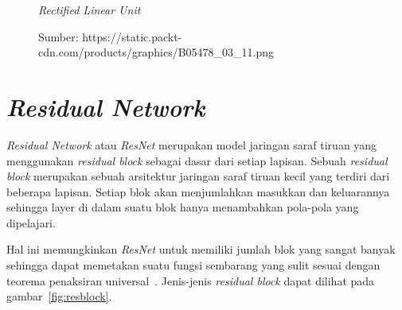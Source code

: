 \begin{figure}[htbp]
    \begin{center}
    \end{center}
    \vspace{-20pt}
    \captionsetup{labelfont=bf, textfont=bf}
    \caption{\textit{Rectified Linear Unit}}
    \vspace{-10pt}
    \captionsetup{labelfont=md, textfont=md}
    \caption*{Sumber: https://static.packt-cdn.com/products/graphics/B05478\_03\_11.png}
    \label{fig:relu}
\end{figure}

\section{\textit{Residual Network}}
\label{sec:2-ResidualNetwork}

\textit{Residual Network} atau \textit{ResNet} merupakan model jaringan saraf tiruan yang menggunakan \textit{residual block}
sebagai dasar dari setiap lapisan. Sebuah \textit{residual block} merupakan sebuah arsitektur jaringan
saraf tiruan kecil yang terdiri dari beberapa lapisan. Setiap blok akan menjumlahkan masukkan dan
keluarannya sehingga layer di dalam suatu blok hanya menambahkan pola-pola yang dipelajari.

Hal ini
memungkinkan \textit{ResNet} untuk memiliki jumlah blok yang sangat banyak sehingga dapat memetakan
suatu fungsi sembarang yang sulit sesuai dengan teorema penaksiran universal~\cite{2015arXiv151203385H}.
Jenis-jenis \textit{residual block} dapat dilihat pada gambar~\ref{fig:resblock}.

